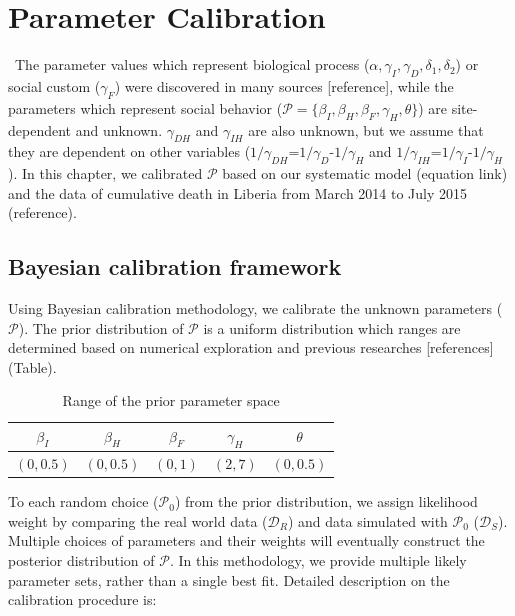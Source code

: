 \newpage
\section{Parameter Calibration}
\label{sec:calibration}
\
The parameter values which represent biological process ($\alpha, \gamma_{I}, \gamma_{D}, \delta_{1}, \delta_{2}$) or social custom ($\gamma_{F}$) were discovered in many sources [reference], while the parameters which represent social behavior ($\mathcal{P}=\{\beta_{I}, \beta_{H}, \beta_{F}, \gamma_{H}, \theta\}$) are site-dependent and unknown. $\gamma_{DH}$ and $\gamma_{IH}$ are also unknown, but we assume that they are dependent on other variables ($1/\gamma_{DH}$=$1/\gamma_{D}$-$1/\gamma_{H}$ and $1/\gamma_{IH}$=$1/\gamma_{I}$-$1/\gamma_{H}$). In this chapter, we calibrated $\mathcal{P}$ based on our systematic model (equation link) and the data of cumulative death in Liberia from March 2014 to July 2015 (reference).
\subsection{Bayesian calibration framework}
Using Bayesian calibration methodology, we calibrate the unknown parameters ($\mathcal{P}$). The prior distribution of $\mathcal{P}$ is a uniform distribution which ranges are determined based on numerical exploration and previous researches [references] (Table). \\

\begin{table}[ht]
\caption{Range of the prior parameter space} %
\centering %
\begin{tabular}{c c c c c}
\hline\hline %
$\beta_{I}$ & $\beta_{H}$ & $\beta_{F}$ & $\gamma_{H}$ & $\theta$ \\ [0.5ex]
\hline %
$(0,0.5)$ & $(0,0.5)$ & $(0,1)$ & $(2,7)$ & $(0,0.5)$ \\ [0.5ex]
\hline
\end{tabular}
\label{tab:Prior Ranges}
\end{table}


To each random choice ($\mathcal{P}_0$) from the prior distribution, we assign likelihood weight by comparing the real world data ($\mathcal{D}_R$) and data simulated with $\mathcal{P}_0$ ($\mathcal{D}_S$). Multiple choices of parameters and their weights will eventually construct the posterior distribution of $\mathcal{P}$. In this methodology, we provide multiple likely parameter sets, rather than a single best fit. Detailed description on the calibration procedure is:\\

